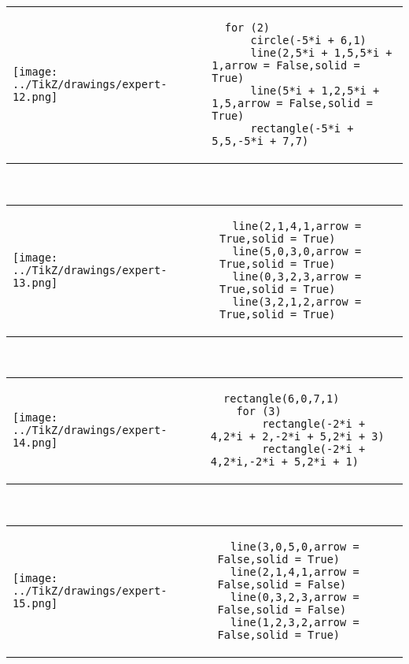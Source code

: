             \begin{tabular}{ll}
    \texttt{[image: ../TikZ/drawings/expert-12.png]}&
    
        \begin{minipage}{10cm}
        \begin{verbatim}
  for (2)
      circle(-5*i + 6,1)
      line(2,5*i + 1,5,5*i + 1,arrow = False,solid = True)
      line(5*i + 1,2,5*i + 1,5,arrow = False,solid = True)
      rectangle(-5*i + 5,5,-5*i + 7,7)
        \end{verbatim}
\end{minipage}

    \end{tabular}        
            \\

            \begin{tabular}{ll}
    \texttt{[image: ../TikZ/drawings/expert-13.png]}&
    
        \begin{minipage}{10cm}
        \begin{verbatim}
  line(2,1,4,1,arrow = True,solid = True)
  line(5,0,3,0,arrow = True,solid = True)
  line(0,3,2,3,arrow = True,solid = True)
  line(3,2,1,2,arrow = True,solid = True)
        \end{verbatim}
\end{minipage}

    \end{tabular}        
            \\

            \begin{tabular}{ll}
    \texttt{[image: ../TikZ/drawings/expert-14.png]}&
    
        \begin{minipage}{10cm}
        \begin{verbatim}
  rectangle(6,0,7,1)
    for (3)
        rectangle(-2*i + 4,2*i + 2,-2*i + 5,2*i + 3)
        rectangle(-2*i + 4,2*i,-2*i + 5,2*i + 1)
        \end{verbatim}
\end{minipage}

    \end{tabular}        
            \\

            \begin{tabular}{ll}
    \texttt{[image: ../TikZ/drawings/expert-15.png]}&
    
        \begin{minipage}{10cm}
        \begin{verbatim}
  line(3,0,5,0,arrow = False,solid = True)
  line(2,1,4,1,arrow = False,solid = False)
  line(0,3,2,3,arrow = False,solid = False)
  line(1,2,3,2,arrow = False,solid = True)
        \end{verbatim}
\end{minipage}

    \end{tabular}        
            \\


